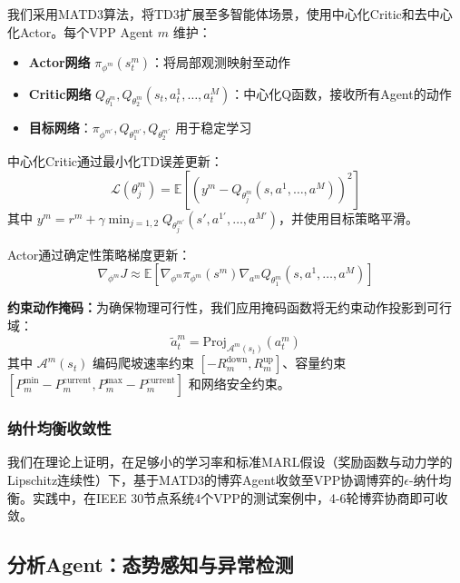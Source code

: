 \documentclass[conference]{IEEEtran}
\begin{document}
我们采用MATD3算法\cite{matd3}，将TD3扩展至多智能体场景，使用中心化Critic和去中心化Actor。每个VPP Agent $m$ 维护：
\begin{itemize}
    \item \textbf{Actor网络} $\pi_{\phi^m}(s_t^m)$：将局部观测映射至动作
    \item \textbf{Critic网络} $Q_{\theta_1^m}, Q_{\theta_2^m}(s_t, a_t^1, \ldots, a_t^M)$：中心化Q函数，接收所有Agent的动作
    \item \textbf{目标网络}：$\pi_{\phi^{m'}}, Q_{\theta_1^{m'}}, Q_{\theta_2^{m'}}$ 用于稳定学习
\end{itemize}

中心化Critic通过最小化TD误差更新：
\begin{equation}
\mathcal{L}(\theta_j^m) = \mathbb{E}\left[ \left( y^m - Q_{\theta_j^m}(s, a^1, \ldots, a^M) \right)^2 \right]
\end{equation}
其中 $y^m = r^m + \gamma \min_{j=1,2} Q_{\theta_j^{m'}}(s', a^{1'}, \ldots, a^{M'})$，并使用目标策略平滑。

Actor通过确定性策略梯度更新：
\begin{equation}
\nabla_{\phi^m} J \approx \mathbb{E}\left[ \nabla_{\phi^m} \pi_{\phi^m}(s^m) \nabla_{a^m} Q_{\theta_1^m}(s, a^1, \ldots, a^M) \right]
\end{equation}

\textbf{约束动作掩码：}为确保物理可行性，我们应用掩码函数将无约束动作投影到可行域：
\begin{equation}
\tilde{a}_t^m = \text{Proj}_{\mathcal{A}^m(s_t)} (a_t^m)
\end{equation}
其中 $\mathcal{A}^m(s_t)$ 编码爬坡速率约束 $[-R_m^{\text{down}}, R_m^{\text{up}}]$、容量约束 $[P_m^{\min} - P_m^{\text{current}}, P_m^{\max} - P_m^{\text{current}}]$ 和网络安全约束。

\subsubsection{纳什均衡收敛性}

我们在理论上证明，在足够小的学习率和标准MARL假设（奖励函数与动力学的Lipschitz连续性）下，基于MATD3的博弈Agent收敛至VPP协调博弈的$\epsilon$-纳什均衡。实践中，在IEEE 30节点系统4个VPP的测试案例中，4-6轮博弈协商即可收敛。

\subsection{分析Agent：态势感知与异常检测}
\end{document}
